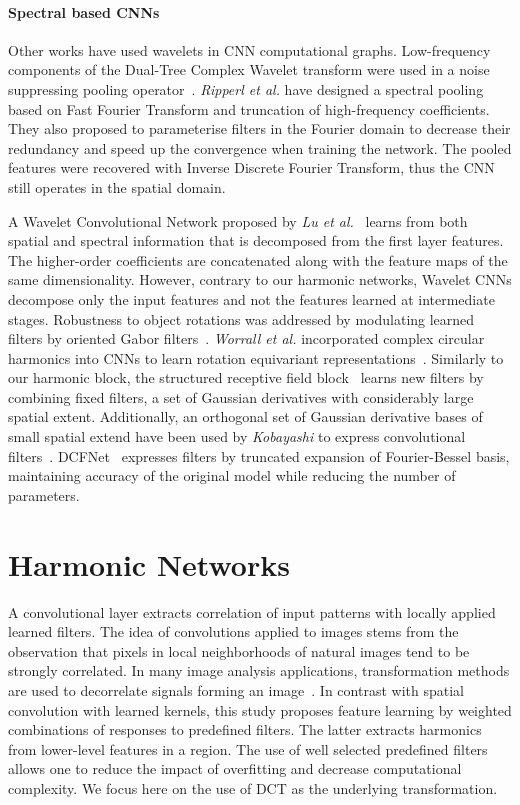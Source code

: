 \documentclass[12pt,a4paper]{article}
\begin{document}
\paragraph{Spectral based CNNs}
Other works have used wavelets in CNN computational graphs. 
Low-frequency components of the Dual-Tree Complex Wavelet transform were used in a noise suppressing pooling operator~\cite{Duan17}. 
\textit{Ripperl et al.} have designed a spectral pooling~\cite{Rippel15} based on Fast Fourier Transform and truncation of high-frequency coefficients. They also proposed to parameterise filters in the Fourier domain to decrease their redundancy and speed up the convergence when training the network. 
The pooled features were recovered with Inverse Discrete Fourier Transform, thus the CNN still operates in the spatial domain.

A Wavelet Convolutional Network proposed by \textit{Lu et al.}~\cite{Lu18} learns from both spatial and spectral information that is decomposed from the first layer features. The higher-order coefficients are concatenated along with the feature maps of the same dimensionality. 
However, contrary to our harmonic networks, Wavelet CNNs decompose only the input features and not the features learned at intermediate stages. 
Robustness to object rotations was addressed by modulating learned filters by oriented Gabor filters~\cite{Luan18}. \textit{Worrall et al.} incorporated complex circular harmonics into CNNs to learn rotation equivariant representations~\cite{Worrall17}. Similarly to our harmonic block, the structured receptive field block~\cite{Jacobsen16} learns new filters by combining fixed filters, a set of Gaussian derivatives with considerably large spatial extent. Additionally, an orthogonal set of Gaussian derivative bases of small spatial extend have been used by \textit{Kobayashi} to express convolutional filters~\cite{Kobayashi18}. DCFNet~\cite{Qiu18} expresses filters by truncated expansion of Fourier-Bessel basis, maintaining accuracy of the original model while reducing the number of parameters. 



\section{Harmonic Networks}\label{sec:method}

A convolutional layer extracts correlation of input patterns with locally applied learned filters. The idea of convolutions applied to images stems from the observation that pixels in local neighborhoods of natural images tend to be strongly correlated. In many image analysis applications, transformation methods are used to decorrelate signals forming an image~\cite{Wang12}. In contrast with spatial convolution with learned kernels, this study proposes feature learning by weighted combinations of responses to predefined filters. The latter extracts harmonics from lower-level features in a region. The use of well selected predefined filters allows one to reduce the impact of overfitting and decrease computational complexity. We focus here on the use of DCT as the underlying transformation.
\end{document}
